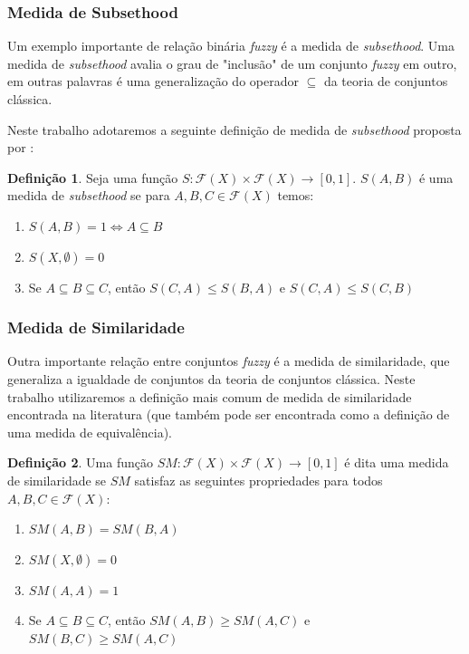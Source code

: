 \documentclass{beamer}
\theoremstyle{definition}
\newtheorem{defi}{Definição}
\begin{document}
\begin{frame}
\frametitle{Medida de Subsethood}
Um exemplo importante de relação binária \textit{fuzzy} é a medida de \textit{subsethood}. Uma medida de \textit{subsethood} avalia o grau de "inclusão" de um conjunto \textit{fuzzy} em outro, em outras palavras é uma generalização do operador $\subseteq$ da teoria de conjuntos clássica.\par
Neste trabalho adotaremos a seguinte definição de medida de \textit{subsethood} proposta por \cite{p7}:
\begin{defi}
 Seja uma função $S:\mathcal{F}(X)\times\mathcal{F}(X) \rightarrow [0,1]$. $S(A,B)$ é uma medida de \textit{subsethood} se para $A,B,C \in \mathcal{F}(X)$ temos:
 \begin{enumerate}
 \item $S(A,B)=1 \Leftrightarrow A \subseteq B$ 
 \item $S(X,\emptyset)=0$ 
 \item Se $A \subseteq B \subseteq C$, então $S(C,A) \leq S(B,A)$ e $S(C,A) \leq S(C,B)$
\end{enumerate}
\end{defi}
\end{frame}

\begin{frame}
\frametitle{Medida de Similaridade}
Outra importante relação entre conjuntos \textit{fuzzy} é a medida de similaridade, que generaliza a igualdade de conjuntos da teoria de conjuntos clássica.
Neste trabalho utilizaremos a definição mais comum de medida de similaridade encontrada na literatura (que também pode ser encontrada como a definição de uma medida de equivalência).
\begin{defi}
Uma função $SM:\mathcal{F}(X)\times\mathcal{F}(X) \rightarrow [0,1]$ é dita uma medida de similaridade se $SM$ satisfaz as seguintes propriedades para todos $A, B, C \in \mathcal{F}(X)$:
\begin{enumerate}
\item $SM(A,B) = SM(B,A)$
\item $SM(X,\emptyset) = 0$
\item $SM(A,A) = 1$
\item Se $A \subseteq B \subseteq C$, então $SM(A,B) \geq SM(A,C)$ e $SM(B,C) \geq SM(A,C)$
\end{enumerate}
\end{defi}
\end{frame}
\end{document}

